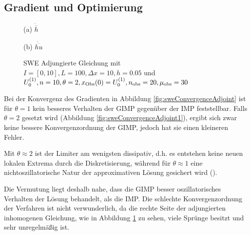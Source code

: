 \subsection{Gradient und Optimierung}
\begin{figure}[H]
\footnotesize
\begin{minipage}[b]{0.49\linewidth}
\centering

\caption*{(a) $\dot{\overline{h}}$}
\end{minipage}
\begin{minipage}[b]{0.49\linewidth}
\centering

\caption*{(b) $\dot{\overline{hu}}$}
\end{minipage}
\caption{SWE Adjungierte Gleichung mit $I=[0,10], L=100,\Delta x=10,h = 0.05$ und $U_0^{(1)},n=10,\theta=2,x_{\text{Obs}}(0)=U_0^{(1)},n_{\text{obs}}=20,\mu_{\text{obs}}=30$}
\label{fig:sweAdjointEqRHS}
\end{figure}
Bei der Konvergenz des Gradienten in Abbildung \ref{fig:sweConvergenceAdjoint} ist für $\theta=1$ kein besseres Verhalten der GIMP gegenüber der IMP feststellbar. Falls $\theta=2$ gesetzt wird (Abbildung \ref{fig:sweConvergenceAdjoint1}), ergibt sich zwar keine bessere Konvergenzordnung der GIMP, jedoch hat sie einen kleineren Fehler. 

Mit $\theta\approx 2$ ist der Limiter am wenigsten dissipativ, d.h. es entstehen keine neuen lokalen Extrema durch die Diskretisierung, während für $\theta\approx 1$ eine nichtoszillatorische Natur der approximativen Lösung gesichert wird (\cite[Abschnitt 6]{kurganov2000new}).

Die Vermutung liegt deshalb nahe, dass die GIMP besser oszillatorisches Verhalten der Lösung behandelt, als die IMP.
Die schlechte Konvergenzordnung der Verfahren ist nicht verwunderlich, da die rechte Seite der adjungierten inhomogenen Gleichung, wie in Abbildung \ref{fig:sweAdjointEqRHS} zu sehen, viele Sprünge besitzt und sehr unregelmäßig ist.

